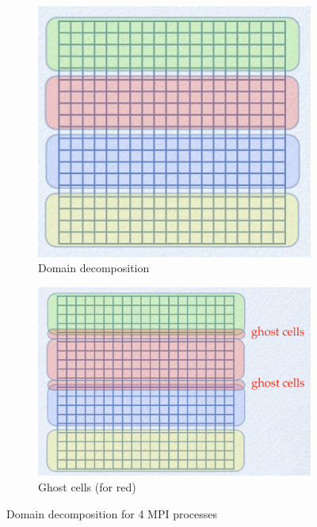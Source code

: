 \documentclass[a4paper]{article}
\begin{document}
\begin{figure}
	\centering
	\begin{subfigure}{0.45\textwidth}
		\includegraphics[height=\textwidth]{domain_decomposition.png}
		\caption{Domain decomposition}
		\label{fig:domain-decomp}
	\end{subfigure}
	\quad
	\begin{subfigure}{0.45\textwidth}
		\includegraphics[height=\textwidth]{ghostcells.png}
		\caption{Ghost cells (for red)}
		\label{fig:domain-decomp-ghost}
	\end{subfigure}
	\caption{Domain decomposition for 4 MPI processes\protect\footnotemark}
	\label{fig:domain-decomp-mpi}
\end{figure}
\end{document}
